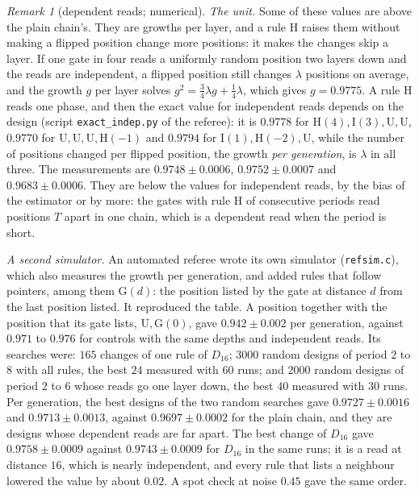 \documentclass[11pt]{amsart}
\theoremstyle{definition}
\theoremstyle{remark}
\newtheorem{remark}[theorem]{Remark}
\begin{document}
\begin{remark}[dependent reads; numerical]
\emph{The unit.} Some of these values are above the plain chain's. They are growths per layer,
and a rule $\mathrm H$ raises them without making a flipped position change more positions: it
makes the changes skip a layer. If one gate in four reads a uniformly random position two layers
down and the reads are independent, a flipped position still changes $\lambda$ positions on
average, and the growth $g$ per layer solves $g^2=\tfrac34\lambda g+\tfrac14\lambda$, which gives
$g=0.9775$. A rule $\mathrm H$ reads one phase, and then the exact value for independent reads
depends on the design (script \texttt{exact\_indep.py} of the referee): it is $0.9778$ for
$\mathrm H(4),\mathrm I(3),\mathrm U,\mathrm U$, $0.9770$ for
$\mathrm U,\mathrm U,\mathrm U,\mathrm H(-1)$ and $0.9794$ for
$\mathrm I(1),\mathrm H(-2),\mathrm U$, while the number of positions changed per flipped
position, the growth \emph{per generation}, is $\lambda$ in all three. The measurements are
$0.9748\pm0.0006$, $0.9752\pm0.0007$ and $0.9683\pm0.0006$. They are below the values for
independent reads, by the bias of the estimator or by more: the gates with rule $\mathrm H$ of
consecutive periods read positions $T$ apart in one chain, which is a dependent read when the
period is short.

\emph{A second simulator.} An automated referee wrote its own simulator (\texttt{refsim.c}),
which also measures the growth per generation, and added rules that follow pointers, among them
$\mathrm G(d)$: the position listed by the gate at distance $d$ from the last position listed.
It reproduced the table. A position together with the position that its gate lists,
$\mathrm U,\mathrm G(0)$, gave $0.942\pm0.002$ per generation, against $0.971$ to $0.976$ for
controls with the same depths and independent reads. Its searches were: $165$ changes of one
rule of $D_{16}$; $3000$ random designs of period $2$ to $8$ with all rules, the best $24$
measured with $60$ runs; and $2000$ random designs of period $2$ to $6$ whose reads go one layer
down, the best $40$ measured with $30$ runs. Per generation, the best designs of the two random
searches gave $0.9727\pm0.0016$ and $0.9713\pm0.0013$, against $0.9697\pm0.0002$ for the plain
chain, and they are designs whose dependent reads are far apart. The best change of $D_{16}$
gave $0.9758\pm0.0009$ against $0.9743\pm0.0009$ for $D_{16}$ in the same runs; it is a read at
distance $16$, which is nearly independent, and every rule that lists a neighbour lowered the
value by about $0.02$. A spot check at noise $0.45$ gave the same order.


\end{remark}
\end{document}
